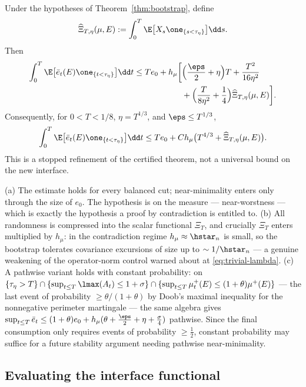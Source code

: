 \documentclass[../../main.tex]{subfiles}
\begin{document}
\begin{theorem}
\label{thm:bootstrap-stopped-interface}
Under the hypotheses of Theorem~\ref{thm:bootstrap}, define
\[
  \widehat\Xi_{T,\eta}(\mu,E)
  :=\int_0^T\E\bigl[X_s\one_{\{s<\tau_\eta\}}\bigr]\dd s.
\]
Then
\begin{align}
  \int_0^T\E\bigl[\bar e_t(E)\one_{\{t<\tau_\eta\}}\bigr]\dd t
  \le Te_0+h_\mu\biggl[
  &\Bigl(\frac\eps2+\eta\Bigr)T+\frac{T^2}{16\eta^2}\notag\\
  &+\Bigl(\frac{T}{8\eta^2}+\frac14\Bigr)
    \widehat\Xi_{T,\eta}(\mu,E)\biggr].
  \label{eq:bootstrap-stopped-interface}
\end{align}
Consequently, for $0<T<1/8$, $\eta=T^{1/3}$, and $\eps\le T^{1/3}$,
\[
  \int_0^T\E\bigl[\bar e_t(E)\one_{\{t<\tau_\eta\}}\bigr]\dd t
  \le Te_0+C h_\mu\bigl(T^{4/3}+\widehat\Xi_{T,\eta}(\mu,E)\bigr).
\]
This is a stopped refinement of the certified theorem, not a universal bound on the new
interface.
\end{theorem}

\begin{remark}[Features]
\label{rem:bootstrap-features}
(a) The estimate holds for every balanced cut; near-minimality enters only through the size of
$e_0$. The hypothesis is on the measure --- near-worstness --- which is exactly the hypothesis a
proof by contradiction is entitled to. (b) All randomness is compressed into the scalar
functional $\Xi_T$, and crucially $\Xi_T$ enters multiplied by $h_\mu$: in the contradiction
regime $h_\mu\approx\hstar_n$ is small, so the bootstrap tolerates covariance excursions of
size up to $\sim1/\hstar_n$ --- a genuine weakening of the operator-norm control warned about
at \eqref{eq:trivial-lambda}. (c) A pathwise variant holds with constant probability: on
$\{\tau_\eta>T\}\cap\{\sup_{t\le T}\lmax(A_t)\le1+\sigma\}\cap\{\sup_{t\le T}\mu_t^+(E)\le
(1+\theta)\mu^+(E)\}$ --- the last event of probability $\ge\theta/(1+\theta)$ by Doob's
maximal inequality for the nonnegative perimeter martingale --- the same algebra gives
$\sup_{t\le T}\bar e_t\le(1+\theta)e_0+h_\mu(\theta+\tfrac\eps2+\eta+\tfrac\sigma4)$ pathwise.
Since the final consumption only requires events of probability $\ge\tfrac12$, constant
probability may suffice for a future stability argument needing pathwise near-minimality.
\end{remark}

\subsection{Evaluating the interface functional}
\label{subsec:interface}
\end{document}
